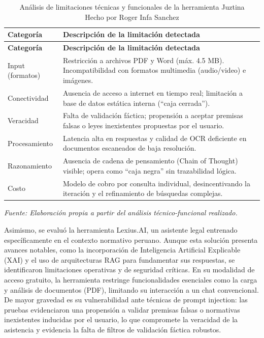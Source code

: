 \begin{longtable}{|p{}|p{}|}
\caption{Análisis de limitaciones técnicas y funcionales de la herramienta Juztina\\Hecho por Roger Infa Sanchez} \\
\hline
\textbf{Categoría} & \textbf{Descripción de la limitación detectada} \\
\hline
\endfirsthead
\hline
\textbf{Categoría} & \textbf{Descripción de la limitación detectada} \\
\hline
\endhead
Input (formatos) & Restricción a archivos PDF y Word (máx. 4.5 MB). Incompatibilidad con formatos multimedia (audio/video) e imágenes. \\
\hline
Conectividad & Ausencia de acceso a internet en tiempo real; limitación a base de datos estática interna (``caja cerrada''). \\
\hline
Veracidad & Falta de validación fáctica; propensión a aceptar premisas falsas o leyes inexistentes propuestas por el usuario. \\
\hline
Procesamiento & Latencia alta en respuestas y calidad de OCR deficiente en documentos escaneados de baja resolución. \\
\hline
Razonamiento & Ausencia de cadena de pensamiento (Chain of Thought) visible; opera como ``caja negra'' sin trazabilidad lógica. \\
\hline
Costo & Modelo de cobro por consulta individual, desincentivando la iteración y el refinamiento de búsquedas complejas. \\
\hline
\end{longtable}

\textit{Fuente: Elaboración propia a partir del análisis técnico-funcional realizado.}

Asimismo, se evaluó la herramienta Lexius.AI, un asistente legal entrenado específicamente en el contexto normativo peruano. Aunque esta solución presenta avances notables, como la incorporación de Inteligencia Artificial Explicable (XAI) y el uso de arquitecturas RAG para fundamentar sus respuestas, se identificaron limitaciones operativas y de seguridad críticas. En su modalidad de acceso gratuito, la herramienta restringe funcionalidades esenciales como la carga y análisis de documentos (PDF), limitando su interacción a un chat convencional. De mayor gravedad es su vulnerabilidad ante técnicas de prompt injection: las pruebas evidenciaron una propensión a validar premisas falsas o normativas inexistentes inducidas por el usuario, lo que compromete la veracidad de la asistencia y evidencia la falta de filtros de validación fáctica robustos.

